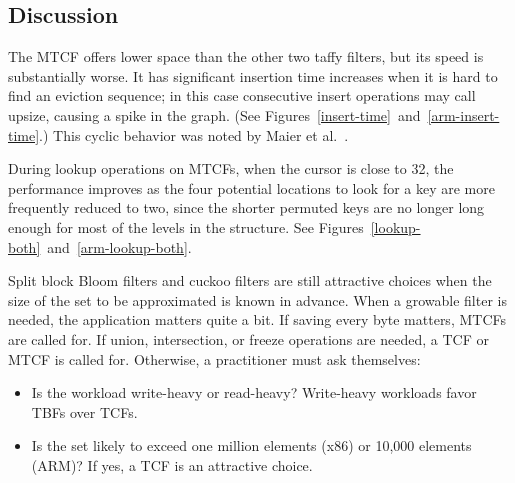 \documentclass[letterpaper,twocolumn,10pt]{article}
\newcommand{\etal}{et al.}
\begin{document}

\subsection{Discussion}

The MTCF offers lower space than the other two taffy filters, but its speed is substantially worse.
It has significant insertion time increases when it is hard to find an eviction sequence; in this case consecutive insert operations may call upsize, causing a spike in the graph. (See Figures~\ref{insert-time}~and~\ref{arm-insert-time}.)
This cyclic behavior was noted by Maier \etal~\cite{dysect}.

During lookup operations on MTCFs, when the cursor is close to 32, the performance improves as the four potential locations to look for a key are more frequently reduced to two, since the shorter permuted keys are no longer long enough for most of the levels in the structure.
See Figures~\ref{lookup-both}~and~\ref{arm-lookup-both}.

Split block Bloom filters and cuckoo filters are still attractive choices when the size of the set to be approximated is known in advance.
When a growable filter is needed, the application matters quite a bit.
If saving every byte matters, MTCFs are called for.
If union, intersection, or freeze operations are needed, a TCF or MTCF is called for.
Otherwise, a practitioner must ask themselves:

\begin{itemize}
\item Is the workload write-heavy or read-heavy?
  Write-heavy workloads favor TBFs over TCFs.
\item Is the set likely to exceed one million elements (x86) or 10,000 elements (ARM)?
  If yes, a TCF is an attractive choice.
\end{itemize}
\end{document}

